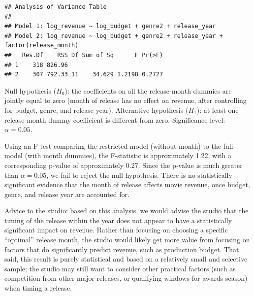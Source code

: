 \documentclass[
]{article}
\begin{document}
\begin{verbatim}
## Analysis of Variance Table
## 
## Model 1: log_revenue ~ log_budget + genre2 + release_year
## Model 2: log_revenue ~ log_budget + genre2 + release_year + factor(release_month)
##   Res.Df    RSS Df Sum of Sq      F Pr(>F)
## 1    318 826.96                           
## 2    307 792.33 11    34.629 1.2198 0.2727
\end{verbatim}

Null hypothesis (\(H_0\)): the coefficients on all the release-month
dummies are jointly equal to zero (month of release has no effect on
revenue, after controlling for budget, genre, and release year).
Alternative hypothesis (\(H_1\)): at least one release-month dummy
coefficient is different from zero. Significance level:
\(\alpha = 0.05\).

Using an F-test comparing the restricted model (without month) to the
full model (with month dummies), the F-statistic is approximately 1.22,
with a corresponding p-value of approximately 0.27. Since the p-value is
much greater than \(\alpha = 0.05\), we fail to reject the null
hypothesis. There is no statistically significant evidence that the
month of release affects movie revenue, once budget, genre, and release
year are accounted for.

Advice to the studio: based on this analysis, we would advise the studio
that the timing of the release within the year does not appear to have a
statistically significant impact on revenue. Rather than focusing on
choosing a specific ``optimal'' release month, the studio would likely
get more value from focusing on factors that do significantly predict
revenue, such as production budget. That said, this result is purely
statistical and based on a relatively small and selective sample; the
studio may still want to consider other practical factors (such as
competition from other major releases, or qualifying windows for awards
season) when timing a release.
\end{document}
